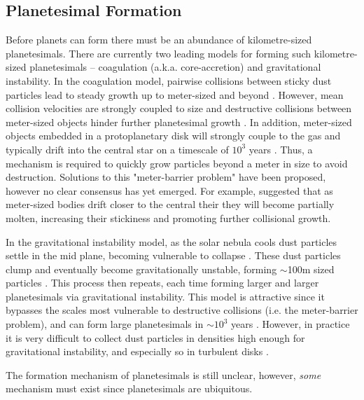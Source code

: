 \subsection{Planetesimal Formation}
Before planets can form there must be an abundance of kilometre-sized planetesimals.
There are currently two leading models for forming such kilometre-sized planetesimals -- coagulation (a.k.a. core-accretion) and gravitational instability. 
In the coagulation model, pairwise collisions between sticky dust particles lead to steady growth up to meter-sized and beyond \citep{Weidenschilling1977b, Armitage2010}.
However, mean collision velocities are strongly coupled to size and destructive collisions between meter-sized objects hinder further planetesimal growth \citep{Weidenschilling1977b, Blum2008}. 
In addition, meter-sized objects embedded in a protoplanetary disk will strongly couple to the gas and typically drift into the central star on a timescale of $10^3$ years \citep{Weidenschilling1977b}.
Thus, a mechanism is required to quickly grow particles beyond a meter in size to avoid destruction. 
Solutions to this "meter-barrier problem" have been proposed, however no clear consensus has yet emerged.  
For example, \citet[e.g.][]{Boley2014} suggested that as meter-sized bodies drift closer to the central their they will become partially molten, increasing their stickiness and promoting further collisional growth. 

In the gravitational instability model, as the solar nebula cools dust particles settle in the mid plane, becoming vulnerable to collapse \citep{Goldreich1973}.
These dust particles clump and eventually become gravitationally unstable, forming $\sim$100m sized particles \citep{Goldreich1973}. 
This process then repeats, each time forming larger and larger planetesimals via gravitational instability.
This model is attractive since it bypasses the scales most vulnerable to destructive collisions (i.e. the meter-barrier problem), and can form large planetesimals in $\sim 10^3$ years \citep{Goldreich1973, Armitage2007}.
However, in practice it is very difficult to collect dust particles in densities high enough for gravitational instability, and especially so in turbulent disks \citep{Armitage2007}.
 
The formation mechanism of planetesimals is still unclear, however, \textit{some} mechanism must exist since planetesimals are ubiquitous. 

